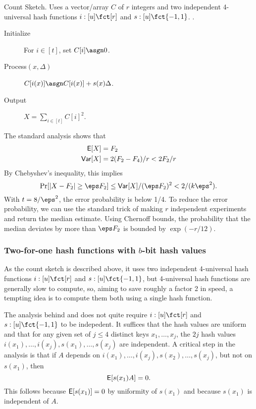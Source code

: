 \begin{algorithm}
  \caption{\label{alg:count-sketch} Count Sketch. Uses a
vector/array $C$ of $r$ integers and two independent
4-universal hash functions $i:[u]\fct[r]$ and $s:[u]\fct\{-1,1\}$.
.}
\begin{description}
\item[Initialize] For $i\in[t]$, set $C[i]\asgn 0$.
\item[Process$(x,\Delta)$] $C[i(x)]\asgn C[i(x)]+s(x) \Delta$. 
\item[Output] $X=\sum_{i\in[t]} C[i]^2$.
\end{description}
\end{algorithm}
The standard analysis \cite{charikar04count-sketch} shows that 
\begin{align}
\operatorname*{\sf{E}}[X]&=F_2\label{eq:E-F2}\\
{\sf Var}[X]&=2(F_2-F_4)/r<2F_2/r\label{eq:V-F2}
\end{align}
By Chebyshev's inequality, this implies
\[\Pr[|X-F_2|\geq \eps F_2]\leq \Var[X]/(\eps F_2)^2<
2/(k\eps^2).\]
With $t=8/\eps^2$, the error probability is below 1/4.
To
reduce the error probability, we can use the standard trick of
making $r$ independent experiments
and return the median estimate. Using Chernoff bounds, the probability
that the median deviates by more than $\eps F_2$ is bounded by
$\exp(-r/12)$.

\subsubsection{Two-for-one hash functions with $b$-bit hash values}
As the count sketch is described above,
it uses two independent 4-universal hash functions
$i:[u]\fct[r]$ and $s:[u]\fct\{-1,1\}$, but 4-universal hash functions
are generally slow to compute, so, aiming to save roughly a factor 2
in speed, a tempting idea is to compute them both using a single hash
function.

The analysis behind  and  does not quite
require $i:[u]\fct[r]$ and $s:[u]\fct\{-1,1\}$ to be indepedent.
It suffices that the hash values are uniform and that for any
given set of $j\leq 4$ distinct keys $x_1,\ldots,x_j$, the $2j$ hash
values $i(x_1),\ldots,i(x_j),s(x_1),\ldots,s(x_j)$ are independent.
A critical step in the analysis is that if
$A$ depends on $i(x_1),\ldots,i(x_j),s(x_2),\ldots,s(x_j)$, but
not on $s(x_1)$, then
\[\operatorname*{\sf{E}}[s(x_1)A]=0.\]
This follows because $\operatorname*{\sf{E}}[s(x_1)]=0$ by uniformity of $s(x_1)$ and because $s(x_1)$ is independent of $A$.
  

